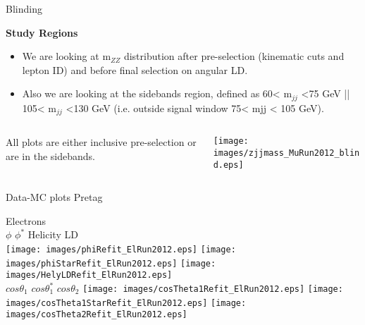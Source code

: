 \documentclass{beamer}
\begin{document}
\begin{frame}{Blinding}

  {\bf Study Regions}
  \begin{itemize}
  \item 
    We are looking at m$_{ZZ}$ distribution after pre-selection (kinematic cuts and lepton ID) and before final selection on angular LD. 
  \item 
    Also we are looking at the sidebands region, defined as 60< m$_{jj}$ <75 GeV || 105< m$_{jj}$ <130 GeV (i.e. outside signal window 75< mjj < 105 GeV).
  \end{itemize}
  

  \begin{columns}
    \begin{column}{0.4\textwidth}
      
      \begin{block}{}
        \begin{center}
          All plots are either inclusive pre-selection or are in the sidebands.\\

        \end{center}
      \end{block}
    \end{column}
    
    \begin{column}{0.6\textwidth}
      \texttt{[image: images/zjjmass\_MuRun2012\_blind.eps]}
      
    \end{column}
  \end{columns}
  
\end{frame}

\begin{frame}{Data-MC plots Pretag}
  \begin{center}
    Electrons\\
    $\phi$ \hspace{7.5em} $\phi^{*}$ \hspace{7.5em} Helicity LD
    \\
  \texttt{[image: images/phiRefit\_ElRun2012.eps]}
  \texttt{[image: images/phiStarRefit\_ElRun2012.eps]}
  \texttt{[image: images/HelyLDRefit\_ElRun2012.eps]}\\
  $cos\theta_{1}$ \hspace{7.5em} $cos\theta_{1}^{*}$ \hspace{7.5em} $cos\theta_{2}$
  \texttt{[image: images/cosTheta1Refit\_ElRun2012.eps]}
  \texttt{[image: images/cosTheta1StarRefit\_ElRun2012.eps]}
  \texttt{[image: images/cosTheta2Refit\_ElRun2012.eps]}
  \end{center}
\end{frame}
\end{document}
